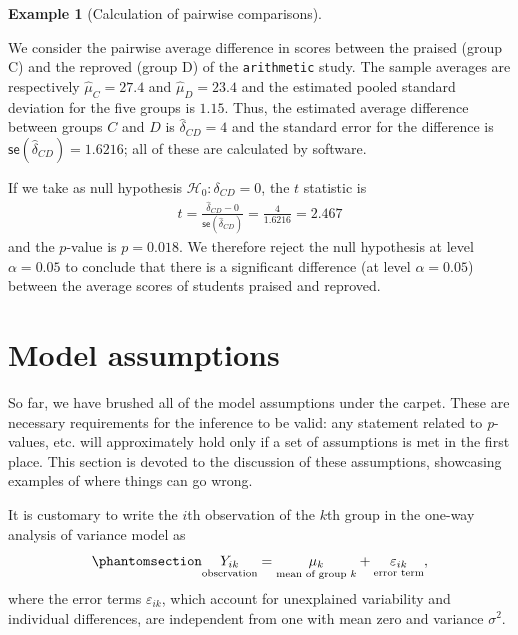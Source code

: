 \documentclass[
  11pt,
  letterpaper,
]{scrbook}
\theoremstyle{definition}
\newtheorem{example}{Example}[chapter]
\theoremstyle{definition}
\theoremstyle{remark}
\begin{document}
\begin{example}[Calculation of pairwise
comparisons]\protect\hypertarget{exm-pairwise-calcul}{}\label{exm-pairwise-calcul}

We consider the pairwise average difference in scores between the
praised (group C) and the reproved (group D) of the \texttt{arithmetic}
study. The sample averages are respectively \(\widehat{\mu}_C = 27.4\)
and \(\widehat{\mu}_D = 23.4\) and the estimated pooled standard
deviation for the five groups is \(1.15\). Thus, the estimated average
difference between groups \(C\) and \(D\) is
\(\widehat{\delta}_{CD} = 4\) and the standard error for the difference
is \(\mathsf{se}(\widehat{\delta}_{CD}) = 1.6216\); all of these are
calculated by software.

If we take as null hypothesis \(\mathscr{H}_0: \delta_{CD}=0\), the
\(t\) statistic is
\begin{align*}t=\frac{\widehat{\delta}_{CD} - 0}{\mathsf{se}(\widehat{\delta}_{CD})} = \frac{4}{1.6216}=2.467
\end{align*} and the \(p\)-value is \(p=0.018\). We therefore reject the
null hypothesis at level \(\alpha=0.05\) to conclude that there is a
significant difference (at level \(\alpha=0.05\)) between the average
scores of students praised and reproved.

\end{example}

\section{Model assumptions}\label{model-assumptions}

So far, we have brushed all of the model assumptions under the carpet.
These are necessary requirements for the inference to be valid: any
statement related to \emph{p}-values, etc. will approximately hold only
if a set of assumptions is met in the first place. This section is
devoted to the discussion of these assumptions, showcasing examples of
where things can go wrong.

It is customary to write the \(i\)th observation of the \(k\)th group in
the one-way analysis of variance model as
\begin{equation}\phantomsection\label{eq-onewayanova}{
\underset{\text{observation}}{Y_{ik}} = \underset{\text{mean of group $k$}}{\mu_k} + \underset{\text{error term}}{\varepsilon_{ik}},
}\end{equation} where the error terms \(\varepsilon_{ik}\), which
account for unexplained variability and individual differences, are
independent from one with mean zero and variance \(\sigma^2\).
\end{document}
